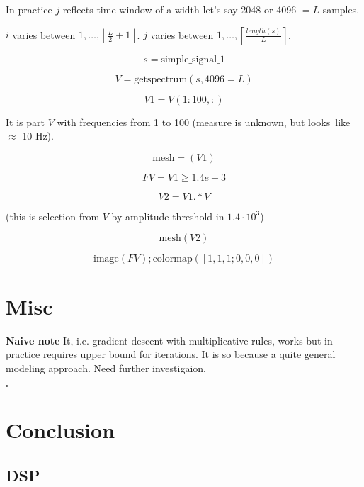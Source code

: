 \documentclass[oneside, final, 14pt]{extarticle}
\begin{document}
In practice $j$ reflects time window of a width
let's say 2048 or 4096 $= L$ samples.

$i$ varies between $1, \dots, \left\lfloor \frac{L}{2}+1 \right\rfloor$.
$j$ varies between $1, \dots, \left\lceil \frac{length(s)}{L} \right\rceil$.

$$s = \text{simple\_signal\_1}$$

$$V = \text{getspectrum}(s,4096 = L)$$

$$V1 = V(1:100,:)$$

It is part $V$ with frequencies from 1 to 100 (measure is unknown,
but looks~like $\approx$ 10 Hz).

$$\text{mesh} = (V1)$$

$$FV = V1 \geqslant 1.4e+3$$

$$V2 = V1 .*  V$$

(this is selection from $V$ by amplitude threshold in $1.4 \cdot 10^3$)

$$\text{mesh}(V2)$$

$$\text{image}(FV); \text{colormap}([1, 1, 1; 0, 0, 0])$$

\section{Misc}

\textbf{Naive note}
It, i.e. gradient descent with multiplicative rules,
works but in practice requires
upper bound for iterations. It is so
because a quite general modeling approach.
Need further investigaion.

$\square$

\section{Conclusion}

\subsection{DSP}
\end{document}
